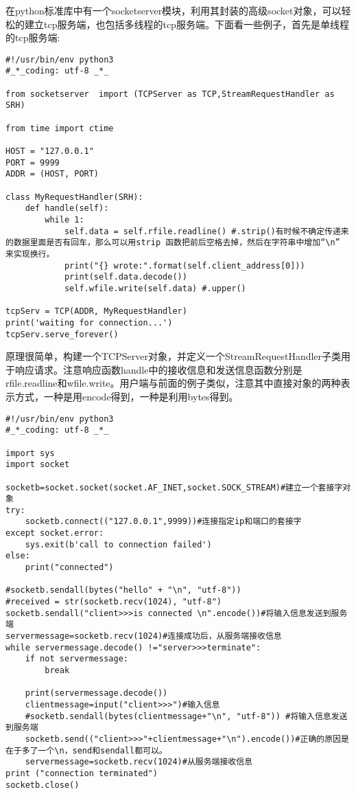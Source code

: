\documentclass[twoside,11pt]{book}
\begin{document}
在python标准库中有一个socketserver模块，利用其封装的高级socket对象，可以轻松的建立tcp服务端，也包括多线程的tcp服务端。下面看一些例子，首先是单线程的tcp服务端:
\begin{lstlisting}
#!/usr/bin/env python3
#_*_coding: utf-8 _*_

from socketserver  import (TCPServer as TCP,StreamRequestHandler as SRH)

from time import ctime

HOST = "127.0.0.1"
PORT = 9999
ADDR = (HOST, PORT)

class MyRequestHandler(SRH):
    def handle(self):
        while 1:
            self.data = self.rfile.readline() #.strip()有时候不确定传递来的数据里面是否有回车，那么可以用strip 函数把前后空格去掉，然后在字符串中增加“\n” 来实现换行。
            print("{} wrote:".format(self.client_address[0]))
            print(self.data.decode())
            self.wfile.write(self.data) #.upper()

tcpServ = TCP(ADDR, MyRequestHandler)
print('waiting for connection...')
tcpServ.serve_forever()
\end{lstlisting}
原理很简单，构建一个TCPServer对象，并定义一个StreamRequestHandler子类用于响应请求。注意响应函数handle中的接收信息和发送信息函数分别是rfile.readline和wfile.write。用户端与前面的例子类似，注意其中直接对象的两种表示方式，一种是用encode得到，一种是利用bytes得到。
\begin{lstlisting}
#!/usr/bin/env python3
#_*_coding: utf-8 _*_

import sys
import socket

socketb=socket.socket(socket.AF_INET,socket.SOCK_STREAM)#建立一个套接字对象
try:
    socketb.connect(("127.0.0.1",9999))#连接指定ip和端口的套接字
except socket.error:
    sys.exit(b'call to connection failed')
else:
    print("connected")

#socketb.sendall(bytes("hello" + "\n", "utf-8"))
#received = str(socketb.recv(1024), "utf-8")
socketb.sendall("client>>>is connected \n".encode())#将输入信息发送到服务端
servermessage=socketb.recv(1024)#连接成功后，从服务端接收信息
while servermessage.decode() !="server>>>terminate":
    if not servermessage:
        break

    print(servermessage.decode())
    clientmessage=input("client>>>")#输入信息
    #socketb.sendall(bytes(clientmessage+"\n", "utf-8")) #将输入信息发送到服务端
    socketb.send(("client>>>"+clientmessage+"\n").encode())#正确的原因是在于多了一个\n，send和sendall都可以。
    servermessage=socketb.recv(1024)#从服务端接收信息
print ("connection terminated")
socketb.close()
\end{lstlisting}
\end{document}
